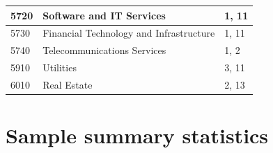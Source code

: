 \documentclass[12pt,twoside]{report}
\begin{document}
\begin{table}[htbp]
{\begin{tabular}{|l|l|l|}
        5720 & Software and IT Services                     & 1, 11 \\ \hline
        5730 & Financial Technology and Infrastructure      & 1, 11 \\ \hline
        5740 & Telecommunications Services                  & 1, 2  \\ \hline
        5910 & Utilities                                    & 3, 11 \\ \hline
        6010 & Real Estate                                  & 2, 13 \\ \hline
    \end{tabular}
    }
\end{table}

\chapter{Sample summary statistics}\label{sec:SampleSummary}
\clearpage
\thispagestyle{empty}
\end{document}
